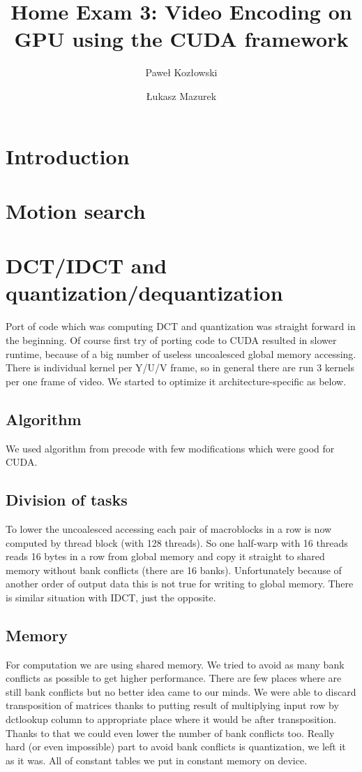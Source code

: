 \documentclass[11pt]{article}
\title{Home Exam 3: Video Encoding on GPU using the CUDA framework}
\author{Paweł Kozłowski \and Łukasz Mazurek}
\begin{document}
\maketitle

\section{Introduction}

\section{Motion search}

\section{DCT/IDCT and quantization/dequantization}
Port of code which was computing DCT and quantization was straight forward in the beginning. Of course first try of porting code to CUDA resulted in slower runtime, because of a big number of useless uncoalesced global memory accessing. There is individual kernel per Y/U/V frame, so in general there are run 3 kernels per one frame of video. We started to optimize it architecture-specific as below.
\subsection{Algorithm}
We used algorithm from precode with few modifications which were good for CUDA.
\subsection{Division of tasks}
To lower the uncoalesced accessing each pair of macroblocks in a row is now computed by thread block (with 128 threads). So one half-warp with 16 threads reads 16 bytes in a row from global memory and copy it straight to shared memory without bank conflicts (there are 16 banks). Unfortunately because of another order of output data this is not true for writing to global memory. There is similar situation with IDCT, just the opposite.
\subsection{Memory}
For computation we are using shared memory. We tried to avoid as many bank conflicts as possible to get higher performance. There are few places where are still bank conflicts but no better idea came to our minds. We were able to discard transposition of matrices thanks to putting result of multiplying input row by dctlookup column to appropriate place where it would be after transposition. Thanks to that we could even lower the number of bank conflicts too. Really hard (or even impossible) part to avoid bank conflicts is quantization, we left it as it was. All of constant tables we put in constant memory on device.
\end{document}
